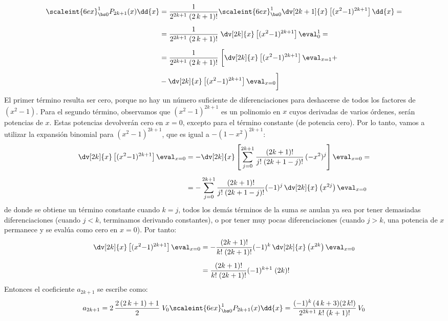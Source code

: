 \begin{align*}
\scaleint{6ex}_{\bs 0}^{1} P_{2k+1} (x) \dd{x} &= \dfrac{1}{2^{2k+1} \; (2 \, k +1)!} \scaleint{6ex}_{\bs 0}^{1} \dv[2k+1]{x} \left[ (x^{2} {-} 1)^{2k+1} \right] \dd{x} = \\[0.5em]
&= \dfrac{1}{2^{2k+1} \; (2 \, k +1)!} \; \dv[2k]{x} \left[ (x^{2} {-} 1)^{2k+1} \right] \eval_{0}^{1} = \\[0.5em]
&= \dfrac{1}{2^{2k+1} \; (2 \, k +1)!} \; \bigg[ \dv[2k]{x} \left[ (x^{2} {-} 1)^{2k+1} \right] \eval_{x=1} + \\[0.5em]
&- \dv[2k]{x} \left[ (x^{2} {-} 1)^{2k+1} \right] \eval_{x=0} \bigg]
\end{align*}
El primer término resulta ser cero, porque no hay un número suficiente de diferenciaciones para deshacerse de todos los factores de $(x^{2} - 1)$. Para el segundo término, observamos que $(x^{2} - 1)^{2k + 1}$ es un polinomio en $x$ cuyos derivadas de varios órdenes, serán potencias de $x$. Estas potencias devolverán cero en $x = 0$, excepto para el término constante (de potencia cero). Por lo tanto, vamos a utilizar la expansión binomial para $(x^{2} - 1)^{2k + 1}$, que es igual a $-(1 {-} x^{2})^{2k + 1}$:
\begin{align*}
\dv[2k]{x} \left[ (x^{2} {-} 1)^{2k+1} \right] \eval_{x=0} &= - \dv[2k]{x} \left[ \sum_{j=0}^{2k+1} \dfrac{(2k+1)!}{j! \; (2k + 1 - j)!} \, (-x^{2})^{j} \right] \eval_{x=0} = \\[0.5em]
&= - \sum_{j=0}^{2k+1} \dfrac{(2k+1)!}{j! \; (2k + 1 - j)!} (-1)^{j} \, \dv[2k]{x} \left( x^{2j} \right) \eval_{x=0}
\end{align*}
de donde se obtiene un término constante cuando $k = j$, todos los demás términos de la suma se anulan ya sea por tener  demasiadas diferenciaciones (cuando $j < k$, terminamos derivando constantes), o por tener muy pocas diferenciaciones (cuando $j > k$, una potencia de $x$ permanece y se evalúa como cero en $x = 0$). Por tanto:
\begin{align*}
\dv[2k]{x} \left[ (x^{2} {-} 1)^{2k+1} \right] \eval_{x=0} &= - \dfrac{(2k+1)!}{k! \; (2k + 1)!} (-1)^{k} \, \dv[2k]{x} \left( x^{2k} \right) \eval_{x=0} \\[0.5em]
&= \dfrac{(2k+1)!}{k! \; (2k + 1)!} (-1)^{k+1} \; (2k)!
\end{align*}
Entonces el coeficiente $a_{2k+1}$ se escribe como:
\begin{align*}
a_{2k+1} = 2 \, \dfrac{2 \, (2 \, k + 1) + 1}{2} \; V_{0} \scaleint{6ex}_{\bs 0}^{1} P_{2k+1} (x) \dd{x} = \dfrac{(-1)^{k} \, (4 \, k + 3)(2 \, k!)}{2^{2k+1} \; k! \; (k+1)!} \, V_{0}
\end{align*}
